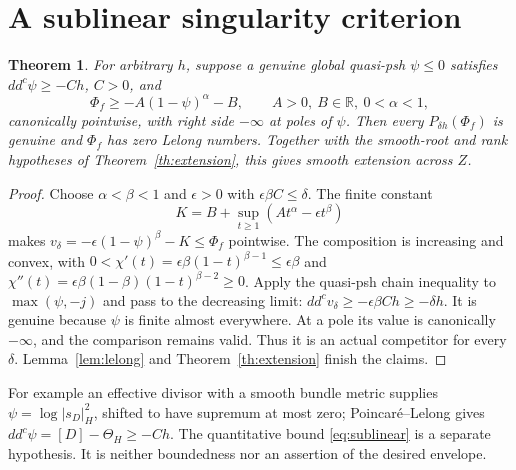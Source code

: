 \documentclass[11pt]{article}
\newcommand{\ddc}{dd^c}
\newcommand{\1}{\mathbf 1}
\newtheorem{theorem}{Theorem}
\theoremstyle{remark}\newtheorem{remark}[theorem]{Remark}
\begin{document}
\section{A sublinear singularity criterion}
\begin{theorem}\label{th:sublinear}
For arbitrary $h$, suppose a genuine global quasi-psh $\psi\leq0$ satisfies
$\ddc\psi\geq-Ch$, $C>0$, and
\begin{equation}\label{eq:sublinear}
 \Phi_f\geq-A(1-\psi)^\alpha-B,
 \qquad A>0,\ B\in\mathbb R,\ 0<\alpha<1,
\end{equation}
canonically pointwise, with right side $-\infty$ at poles of $\psi$.
Then every $P_{\delta h}(\Phi_f)$ is genuine and $\Phi_f$ has zero Lelong
numbers. Together with the smooth-root and rank hypotheses of
Theorem~\ref{th:extension}, this gives smooth extension across $Z$.
\end{theorem}
\begin{proof}
Choose $\alpha<\beta<1$ and $\epsilon>0$ with $\epsilon\beta C\leq\delta$.
The finite constant
\[
 K=B+\sup_{t\geq1}(At^\alpha-\epsilon t^\beta)
\]
makes $v_\delta=-\epsilon(1-\psi)^\beta-K\leq\Phi_f$ pointwise.
The composition is increasing and convex, with
$0<\chi'(t)=\epsilon\beta(1-t)^{\beta-1}\leq\epsilon\beta$ and
$\chi''(t)=\epsilon\beta(1-\beta)(1-t)^{\beta-2}\geq0$.
Apply the quasi-psh chain inequality to $\max(\psi,-j)$ and pass to the
decreasing limit: $\ddc v_\delta\geq-\epsilon\beta Ch\geq-\delta h$.
It is genuine because $\psi$ is finite almost everywhere.
At a pole its value is canonically $-\infty$, and the comparison remains
valid. Thus it is an actual competitor for every $\delta$.
Lemma~\ref{lem:lelong} and Theorem~\ref{th:extension} finish the claims.
\end{proof}
For example an effective divisor with a smooth bundle metric supplies
$\psi=\log|s_D|_H^2$, shifted to have supremum at most zero;
Poincar\'e--Lelong gives $\ddc\psi=[D]-\Theta_H\geq-Ch$.
The quantitative bound \eqref{eq:sublinear} is a separate hypothesis.
It is neither boundedness nor an assertion of the desired envelope.
\end{document}
